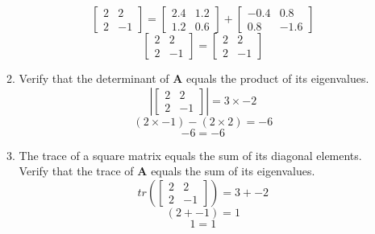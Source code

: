 \documentclass[12pt,a4paper]{paper}
\begin{document}
\begin{enumerate}
\begin{enumerate}
\begin{equation}
\end{equation}
\begin{equation}
\left[\begin{array}{cc}2 & 2 \\ 2 & -1\end{array}\right] = \left[\begin{array}{cc}2.4 & 1.2 \\ 1.2 & 0.6\end{array}\right] + \left[\begin{array}{cc}-0.4 & 0.8 \\ 0.8 & -1.6\end{array}\right]
\end{equation}
\begin{equation}
\left[\begin{array}{cc}2 & 2 \\ 2 & -1\end{array}\right] = \left[\begin{array}{cc}2 & 2 \\ 2 & -1\end{array}\right] 
\end{equation}
\item Verify that the determinant of \textbf{A} equals the product of its eigenvalues.
\begin{equation}
\left|\left[\begin{array}{cc}2 & 2 \\ 2 & -1\end{array}\right]\right| = 3 \times -2
\end{equation}
\begin{equation}
\left(2 \times -1\right)-\left(2 \times 2\right) = -6
\end{equation}
\begin{equation}
-6 = -6
\end{equation}
\item The trace of a square matrix equals the sum of its diagonal elements. Verify that the
trace of \textbf{A} equals the sum of its eigenvalues.
\begin{equation}
tr\left(\left[\begin{array}{cc}2 & 2 \\ 2 & -1\end{array}\right]\right) = 3 + -2
\end{equation}
\begin{equation}
(2 + -1) = 1
\end{equation}
\begin{equation}
1 = 1

\end{equation}
\end{enumerate}
\end{enumerate}
\end{document}
